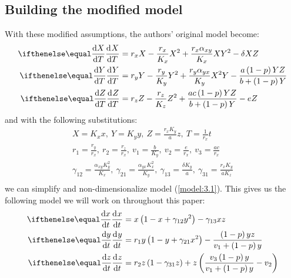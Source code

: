 \subsection{Building the modified model}\label{subsec:modified_model}
With these modified assumptions, the authors' original model become:
\begin{subequations}
    \begin{align}
        \diff[]{X}{T} &= r_xX-\frac{r_x}{K_x}X^2+\frac{r_x\alpha_{xy}}{K_x}XY^2-\delta XZ
        \label{model:3.1a}\\
        \diff[]{Y}{T} &= r_yY-\frac{r_y}{K_y}Y^2+\frac{r_y\alpha_{yx}}{K_y}X^2Y-\frac{a\left(1-p\right)YZ}{b+\left(1-p\right)Y}
        \label{model:3.1b}\\
        \diff[]{Z}{T} &= r_zZ-\frac{r_z}{K_z}Z^2+\frac{ac\left(1-p\right)YZ}{b+\left(1-p\right)Y}-eZ
        \label{model:3.1c}
    \end{align}
    \label{model:3.1}
\end{subequations}
and with the following substitutions:
\begin{gather*}
    X=K_xx,\ Y=K_yy,\ Z=\frac{r_xK_y}{a}z,\ T=\frac{1}{r_x}t\\
    r_1=\frac{r_y}{r_x},\ r_2=\frac{r_z}{r_x},\ v_1=\frac{b}{K_y},\ v_2=\frac{e}{r_x},\ v_3=\frac{ac}{r_x}\\
    \gamma_{12}=\frac{\alpha_{xy}K_y^2}{K_x},\ \gamma_{21}=\frac{\alpha_{yx}K_x^2}{K_y},\ \gamma_{13}=\frac{\delta K_y}{a},\ \gamma_{31}=\frac{r_xK_y}{aK_z}\\
\end{gather*}
we can simplify and non-dimensionalize model (\ref{model:3.1}). This gives us the following model we will work on throughout this paper:
\begin{subequations}
    \begin{align}
        \diff[]{x}{t} &= x\left(1-x+\gamma_{12}y^2\right)-\gamma_{13}xz
        \label{model:3.2a}\\
        \diff[]{y}{t} &= r_1y\left(1-y+\gamma_{21}x^2\right)-\frac{\left(1-p\right)yz}{v_1+\left(1-p\right)y}
        \label{model:3.2b}\\
        \diff[]{z}{t} &= r_2z\left(1-\gamma_{31}z\right)+z\left(\frac{v_3\left(1-p\right)y}{v_1+\left(1-p\right)y}-v_2\right)
        \label{model:3.2c}
    \end{align}
    \label{model:3.2}
\end{subequations}


